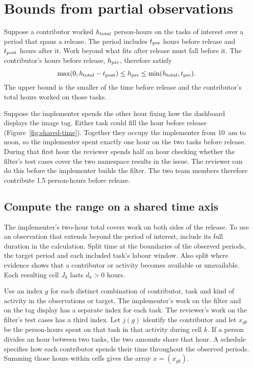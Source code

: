 \section{Bounds from partial observations}
\label{sec:bounds}

Suppose a contributor worked $h_{\rm total}$ person-hours on the tasks of interest over a period that spans a release. The period includes $t_{\rm pre}$ hours before release and $t_{\rm post}$ hours after it. Work beyond what fits after release must fall before it. The contributor's hours before release, $h_{\rm pre}$, therefore satisfy
\[
  \max(0,h_{\rm total}-t_{\rm post})\le h_{\rm pre}
  \le\min(h_{\rm total},t_{\rm pre}).
\]
The upper bound is the smaller of the time before release and the contributor's total hours worked on those tasks.

Suppose the implementer spends the other hour fixing how the dashboard displays the image tag. Either task could fill the hour before release (Figure~\ref{fig:shared-time}). Together they occupy the implementer from 10~am to noon, so the implementer spent exactly one hour on the two tasks before release. During that first hour the reviewer spends half an hour checking whether the filter's test cases cover the two namespace results in the issue. The reviewer can do this before the implementer builds the filter. The two team members therefore contribute 1.5 person-hours before release.



\subsection{Compute the range on a shared time axis}

The implementer's two-hour total covers work on both sides of the release. To use an observation that extends beyond the period of interest, include its full duration in the calculation. Split time at the boundaries of the observed periods, the target period and each included task's labour window. Also split where evidence shows that a contributor or activity becomes available or unavailable. Each resulting cell $J_k$ lasts $d_k>0$ hours.

Use an index $g$ for each distinct combination of contributor, task and kind of activity in the observations or target. The implementer's work on the filter and on the tag display has a separate index for each task. The reviewer's work on the filter's test cases has a third index. Let $j(g)$ identify the contributor and let $x_{gk}$ be the person-hours spent on that task in that activity during cell $k$. If a person divides an hour between two tasks, the two amounts share that hour. A schedule specifies how each contributor spends their time throughout the observed periods. Summing those hours within cells gives the array $x=(x_{gk})$.

